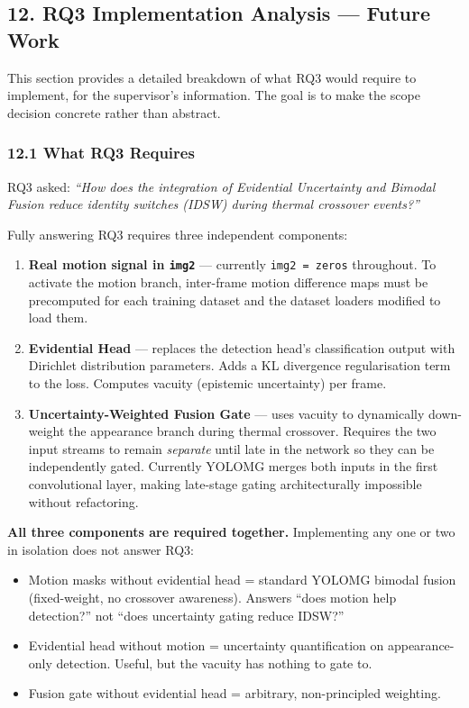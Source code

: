 \subsection*{12. RQ3 Implementation Analysis — Future Work}

This section provides a detailed breakdown of what RQ3 would require
to implement, for the supervisor's information. The goal is to make
the scope decision concrete rather than abstract.

\subsubsection*{12.1 What RQ3 Requires}

RQ3 asked: \textit{``How does the integration of Evidential Uncertainty
and Bimodal Fusion reduce identity switches (IDSW) during thermal
crossover events?''}

Fully answering RQ3 requires three independent components:

\begin{enumerate}
    \item \textbf{Real motion signal in \texttt{img2}} — currently
    \texttt{img2\,=\,zeros} throughout. To activate the motion branch,
    inter-frame motion difference maps must be precomputed for each
    training dataset and the dataset loaders modified to load them.

    \item \textbf{Evidential Head} — replaces the detection head's
    classification output with Dirichlet distribution parameters. Adds
    a KL divergence regularisation term to the loss. Computes vacuity
    (epistemic uncertainty) per frame.

    \item \textbf{Uncertainty-Weighted Fusion Gate} — uses vacuity to
    dynamically down-weight the appearance branch during thermal crossover.
    Requires the two input streams to remain \textit{separate} until late
    in the network so they can be independently gated. Currently YOLOMG
    merges both inputs in the first convolutional layer, making late-stage
    gating architecturally impossible without refactoring.
\end{enumerate}

\noindent \textbf{All three components are required together.}
Implementing any one or two in isolation does not answer RQ3:
\begin{itemize}
    \item Motion masks without evidential head = standard YOLOMG bimodal
    fusion (fixed-weight, no crossover awareness). Answers ``does motion
    help detection?'' not ``does uncertainty gating reduce IDSW?''
    \item Evidential head without motion = uncertainty quantification on
    appearance-only detection. Useful, but the vacuity has nothing to
    gate to.
    \item Fusion gate without evidential head = arbitrary, non-principled
    weighting.
\end{itemize}


